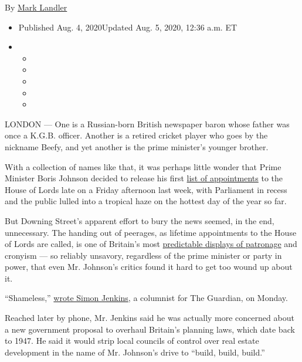 By \href{https://www.nytimes3xbfgragh.onion/by/mark-landler}{Mark
Landler}

\begin{itemize}
\item
  Published Aug. 4, 2020Updated Aug. 5, 2020, 12:36 a.m. ET
\item
  \begin{itemize}
  \item
  \item
  \item
  \item
  \item
  \end{itemize}
\end{itemize}

LONDON --- One is a Russian-born British newspaper baron whose father
was once a K.G.B. officer. Another is a retired cricket player who goes
by the nickname Beefy, and yet another is the prime minister's younger
brother.

With a collection of names like that, it was perhaps little wonder that
Prime Minister Boris Johnson decided to release his first
\href{https://www.nytimes3xbfgragh.onion/aponline/2020/07/31/world/europe/ap-eu-britain-house-of-lords-1st-ld-writethru.html}{list
of appointments} to the House of Lords late on a Friday afternoon last
week, with Parliament in recess and the public lulled into a tropical
haze on the hottest day of the year so far.

But Downing Street's apparent effort to bury the news seemed, in the
end, unnecessary. The handing out of peerages, as lifetime appointments
to the House of Lords are called, is one of Britain's most
\href{https://www.nytimes3xbfgragh.onion/2015/12/18/world/europe/britain-house-of-lords-changes.html}{predictable
displays of patronage} and cronyism --- so reliably unsavory, regardless
of the prime minister or party in power, that even Mr. Johnson's critics
found it hard to get too wound up about it.

``Shameless,''
\href{https://www.theguardian.com/commentisfree/2020/aug/03/boris-johnsons-list-of-lords-is-a-disgrace-corruption-westminster}{wrote
Simon Jenkins}, a columnist for The Guardian, on Monday.

Reached later by phone, Mr. Jenkins said he was actually more concerned
about a new government proposal to overhaul Britain's planning laws,
which date back to 1947. He said it would strip local councils of
control over real estate development in the name of Mr. Johnson's drive
to ``build, build, build.''

